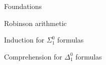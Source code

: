 \documentclass[12pt]{PalisadesLakesBook}
\begin{document}
\begin{plSection}{Foundations}
\begin{plSection}{}
\begin{plSection}{Robinson arithmetic~ \cite{wiki:RobinsonArithmetic}}
\begin{enumerate}
    \end{enumerate}


  \end{plSection}%

  \begin{plSection}{Induction for $\Sigma^{0}_{1}$ formulas}
  \end{plSection}%

  \begin{plSection}{Comprehension for $\Delta^{0}_{1}$ formulas}
  \end{plSection}%

\end{plSection}%

\end{plSection}%
\end{document}
